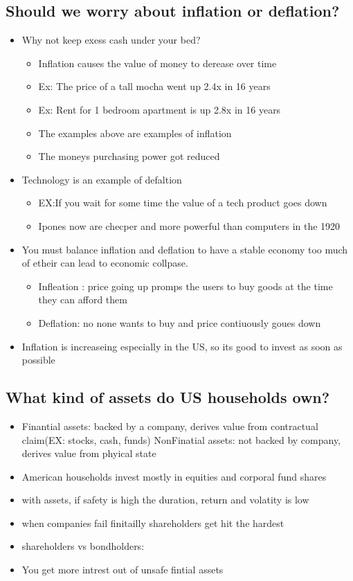 \documentclass[11pt]{article}
\begin{document}
\subsection{Should we worry about inflation or deflation?}
\label{sec:orgc6d3990}
\begin{itemize}
\item Why not keep exess cash under your bed?
\begin{itemize}
\item Inflation causes the value of money to derease over time
\item Ex: The price of a tall mocha went up 2.4x in 16 years
\item Ex: Rent for 1 bedroom apartment is up 2.8x in 16 years
\item The examples above are examples of inflation
\item The moneys purchasing power got reduced
\end{itemize}
\item Technology is an example of defaltion
\begin{itemize}
\item EX:If you wait for some time the value of a tech product goes down
\item Ipones now are checper and more powerful than computers in the 1920
\end{itemize}
\item You must balance inflation and deflation to have a stable economy
too much of etheir can lead to economic collpase.
\begin{itemize}
\item Infleation : price going up promps the users to buy goods at the time they can
afford them
\item Deflation: no none wants to buy and price contiuously goues down
\end{itemize}
\item Inflation is increaseing especially in the US, so its good to invest as
soon as possible
\end{itemize}
\subsection{What kind of assets do US households own?}
\label{sec:org6dace77}
\begin{itemize}
\item Finantial assets: backed by a company, derives value from contractual claim(EX: stocks, cash, funds)
NonFinatial assets: not backed by company, derives value from phyical state
\item American households invest mostly in equities and corporal fund shares
\item with assets, if safety is high the duration, return and volatity is low
\item when companies fail finitailly shareholders get hit the hardest
\item shareholders vs bondholders:
\item You get more intrest out of unsafe fintial assets
\end{itemize}
\end{document}
